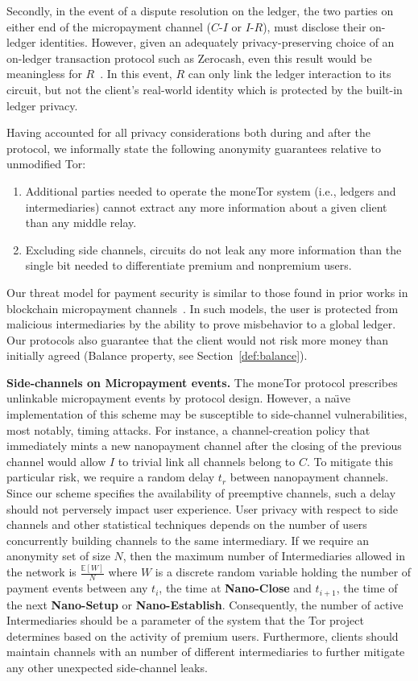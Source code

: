 Secondly, in the event of a dispute resolution on the ledger, the two parties on either end of the micropayment channel ($C$-$I$ or $I$-$R$), must disclose their on-ledger identities.
However, given an adequately privacy-preserving choice of an on-ledger transaction protocol such as Zerocash, even this result would be meaningless for $R$~\cite{sasson2014zerocash}.
In this event, $R$ can only link the ledger interaction to its circuit, but not the client's real-world identity which is protected by the built-in ledger privacy.

Having accounted for all privacy considerations both during and after the protocol, we informally state the following anonymity guarantees relative to unmodified Tor:

\begin{enumerate}
\item Additional parties needed to operate the moneTor system (i.e., ledgers and intermediaries) cannot extract any more information about a given client than any middle relay.
\item Excluding side channels, circuits do not leak any more information than the single bit needed to differentiate premium and nonpremium users.
\end{enumerate}

Our threat model for payment security is similar to those found in prior works in blockchain micropayment channels~\cite{poon2016bitcoin}.
In such models, the user is protected from malicious intermediaries by the ability to prove misbehavior to a global ledger.
Our protocols also guarantee that the client would not risk more money than initially agreed (Balance property, see Section~\ref{def:balance}).

\medskip \noindent\textbf{Side-channels on Micropayment events.}
The moneTor protocol prescribes unlinkable micropayment events by protocol design.
However, a na\"{\i}ve implementation of this scheme may be susceptible to side-channel vulnerabilities, most notably, timing attacks.
For instance, a channel-creation policy that immediately mints a new nanopayment channel after the closing of the previous channel would allow $I$ to trivial link all channels belong to $C$.
To mitigate this particular risk, we require a random delay $t_r$ between nanopayment channels.
Since our scheme specifies the availability of preemptive channels, such a delay should not perversely impact user experience.
User privacy with respect to side channels and other statistical techniques depends on the number of users concurrently building channels to the same intermediary.
If we require an anonymity set of size $N$, then the maximum number of Intermediaries allowed in the network is $\frac{\mathbb{E}[W]}{N}$ where $W$ is a discrete random variable holding the number of payment events between any $t_i$, the time at \textbf{Nano-Close} and $t_{i+1}$, the time of the next \textbf{Nano-Setup} or \textbf{Nano-Establish}.
Consequently, the number of active Intermediaries should be a parameter of the system that the Tor project determines based on the activity of premium users.
Furthermore, clients should maintain channels with an number of different intermediaries to further mitigate any other unexpected side-channel leaks.

